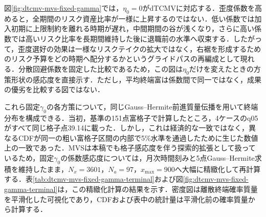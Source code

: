 \documentclass[10pt,a4paper]{article}
\theoremstyle{plain}
\theoremstyle{definition}
\begin{document}
図\ref{fig:dtcmv-mvs-fixed-gamma}では，$\eta_0=0$がdTCMVに対応する．歪度係数を高めると，全期間のリスク資産比率が一様に上昇するのではない．低い係数では加入初期に上限制約を離れる時期が遅れ，中間期間の谷が浅くなり，さらに高い係数では高いリスク比率を長期間維持した後に退職前の水準へ収束する．したがって，歪度選好の効果は一様なリスクテイクの拡大ではなく，右裾を形成するためのリスク予算をどの時期へ配分するかというグライドパスの再編成として現れる．分散回避係数を固定した比較であるため，この図は$\eta_0$だけを変えたときの方策形状の感応度を直接示す．ただし，平均終端富は係数間で同一ではなく，成果の優劣を比較する図ではない．

これら固定$\gamma_0$の各方策について，同じGauss--Hermite前進質量伝播を用いて終端分布を構成できる．当初，基準の151点富格子で計算したところ，4ケースのq05がすべて同じ格子点39.14に載った．しかし，これは経済的な一致ではなく，異なるCDFが同一の粗い富格子区間の内部で5\%水準を通過したために生じた数値上の一致であった．MVSは本稿でも格子感応度を伴う探索的拡張として扱っているため，固定$\gamma_0$の係数感応度については，月次時間刻みと5点Gauss--Hermite求積を維持したまま，$N_x=3601$，$N_a=97$，$x_{\max}=900$へ大幅に精緻化して再計算する．表\ref{tab:dtcmv-mvs-fixed-gamma-terminal}および図\ref{fig:dtcmv-mvs-fixed-gamma-terminal}は，この精緻化計算の結果を示す．密度図は離散終端確率質量を平滑化した可視化であり，CDFおよび表中の統計量は平滑化前の確率質量から計算する．

\begin{table}[htbp]
\centering\scriptsize
\caption{固定$\gamma_0=2.5$のdTCMV--MVSグライドパスが生み出す精緻化終端分布統計量（$N_x=3601$，$N_a=97$，$x_{\max}=900$）}
\label{tab:dtcmv-mvs-fixed-gamma-terminal}
\end{table}
\end{document}
